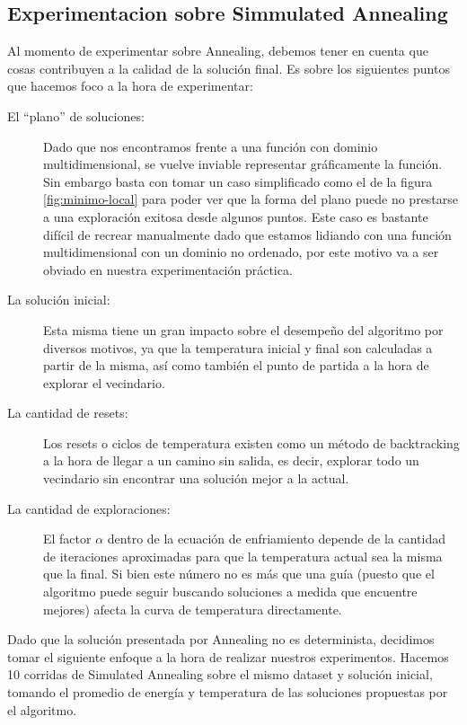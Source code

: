 \subsection{Experimentacion sobre Simmulated Annealing}

Al momento de experimentar sobre Annealing, debemos tener en cuenta que cosas contribuyen a la calidad de la solución final. Es sobre los siguientes puntos que hacemos foco a la hora de experimentar:

\begin{description}
\item[El “plano” de soluciones:] Dado que nos encontramos frente a una función con dominio multidimensional, se vuelve inviable representar gráficamente la función. Sin embargo basta con tomar un caso simplificado como el de la figura \ref{fig:minimo-local} para poder ver que la forma del plano puede no prestarse a una exploración exitosa desde algunos puntos. Este caso es bastante difícil de recrear manualmente dado que estamos lidiando con una función multidimensional con un dominio no ordenado, por este motivo va a ser obviado en nuestra experimentación práctica.

\item[La solución inicial:] Esta misma tiene un gran impacto sobre el desempeño del algoritmo por diversos motivos, ya que la temperatura inicial y final son calculadas a partir de la misma, así como también el punto de partida a la hora de explorar el vecindario.

\item[La cantidad de resets:] Los resets o ciclos de temperatura existen como un método de backtracking a la hora de llegar a un camino sin salida, es decir, explorar todo un vecindario sin encontrar una solución mejor a la actual.

\item[La cantidad de exploraciones:] El factor $\alpha$ dentro de la ecuación de enfriamiento depende de la cantidad de iteraciones aproximadas para que la temperatura actual sea la misma que la final. Si bien este número no es más que una guía (puesto que el algoritmo puede seguir buscando soluciones a medida que encuentre mejores) afecta la curva de temperatura directamente.

\end{description}


Dado que la solución presentada por Annealing no es determinista, decidimos tomar el siguiente enfoque a la hora de realizar nuestros experimentos.
Hacemos 10 corridas de Simulated Annealing sobre el mismo dataset y solución inicial, tomando el promedio de energía y temperatura de las soluciones propuestas por el algoritmo.

